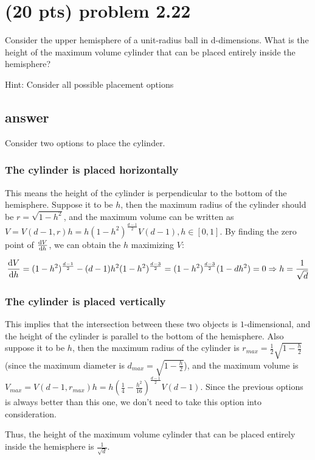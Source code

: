 \documentclass[12pt]{article}%
\begin{document}
    
\section{(20 pts) problem 2.22}
Consider the upper hemisphere of a unit-radius ball in d-dimensions.
What is the height of the maximum volume cylinder that can be placed entirely inside the hemisphere?

Hint: Consider all possible placement options

\subsection*{answer}

Consider two options to place the cylinder.

\subsubsection*{The cylinder is placed horizontally}

This means the height of the cylinder is perpendicular to the bottom of the hemisphere. Suppose it to be $h$, then the maximum radius of the cylinder should be $r = \sqrt{1 - h^2}$, and the maximum volume can be written as $V = V(d - 1, r)h = h(1 - h^2)^{\frac{d-1}{2}}V(d-1), h \in [0, 1]$. By finding the zero point of $\frac{\text dV}{\text dh}$, we can obtain the $h$ maximizing $V$: 

$$\frac{\text dV}{\text dh} = (1-h^2)^{\frac{d-1}{2}} - (d-1)h^2(1-h^2)^{\frac{d-3}{2}} = (1-h^2)^{\frac{d-3}{2}}(1 - dh^2) = 0  \Rightarrow h = \frac{1}{\sqrt d}$$
\subsubsection*{The cylinder is placed vertically}

This implies that the intersection between these two objects is $1$-dimensional, and the height of the cylinder is parallel to the bottom of the hemisphere. Also suppose it to be $h$, then the maximum radius of the cylinder is $r_{max} = \frac12\sqrt{1 - \frac{h}{2}}$(since the maximum diameter is $d_{max} = \sqrt{1-\frac h2}$), and the maximum volume is $V_{max} = V(d - 1, r_{max})h = h(\frac14 - \frac{h^2}{16})^{\frac{d-1}{2}}V(d-1)$. Since the previous options is always better than this one, we don't need to take this option into consideration.

Thus, the height of the maximum volume cylinder that can be placed entirely inside the hemisphere is $\frac{1}{\sqrt d}$.
\end{document}
